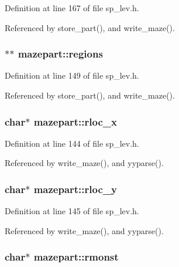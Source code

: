 Definition at line 167 of file sp\+\_\+lev.\+h.



Referenced by store\+\_\+part(), and write\+\_\+maze().

\hypertarget{structmazepart_a8a9f2792dad915353d99cc6b807fa94a}{
\subsubsection[{regions}]{$\ast$$\ast$ mazepart\+::regions}}\label{structmazepart_a8a9f2792dad915353d99cc6b807fa94a}


Definition at line 149 of file sp\+\_\+lev.\+h.



Referenced by store\+\_\+part(), and write\+\_\+maze().

\hypertarget{structmazepart_abacd502b4c130c8f1535b3a2e7395a5a}{
\subsubsection[{rloc\+\_\+x}]{\setlength{\rightskip}{0pt plus 5cm}char$\ast$ mazepart\+::rloc\+\_\+x}}\label{structmazepart_abacd502b4c130c8f1535b3a2e7395a5a}


Definition at line 144 of file sp\+\_\+lev.\+h.



Referenced by write\+\_\+maze(), and yyparse().

\hypertarget{structmazepart_a9a9a457b7e85fd5de9ed2a7d45ed49a1}{
\subsubsection[{rloc\+\_\+y}]{\setlength{\rightskip}{0pt plus 5cm}char$\ast$ mazepart\+::rloc\+\_\+y}}\label{structmazepart_a9a9a457b7e85fd5de9ed2a7d45ed49a1}


Definition at line 145 of file sp\+\_\+lev.\+h.



Referenced by write\+\_\+maze(), and yyparse().

\hypertarget{structmazepart_a5eb64241e5204b06d52328993eb37380}{
\subsubsection[{rmonst}]{\setlength{\rightskip}{0pt plus 5cm}char$\ast$ mazepart\+::rmonst}}\label{structmazepart_a5eb64241e5204b06d52328993eb37380}


